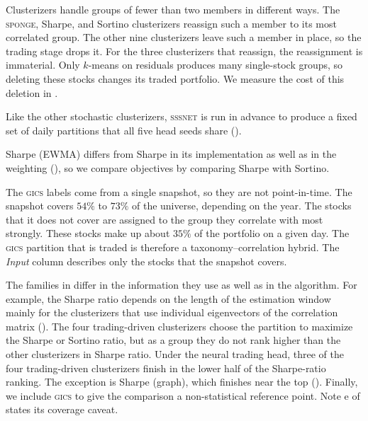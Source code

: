 \begin{table}[htbp]
\begin{threeparttable}
\begin{tablenotes}[flushleft]
\item[b] Clusterizers handle groups of fewer than two members in different ways.
The \textsc{sponge}, Sharpe, and Sortino clusterizers reassign such a member to its most
correlated group. The other nine clusterizers leave such a member in place, so the trading
stage drops it. For the three clusterizers that reassign, the reassignment is immaterial. Only $k$-means on residuals produces many single-stock groups, so deleting these stocks changes its traded portfolio. We measure the cost of this deletion in .
\item[c] Like the other stochastic clusterizers, \textsc{sssnet} is run in advance to produce a fixed set of daily partitions that all five head seeds share ().
\item[d] Sharpe (EWMA) differs from Sharpe in its implementation as well as in the weighting (), so we compare objectives by comparing Sharpe with Sortino.
\item[e] The \textsc{gics} labels come from a single snapshot, so they are not point-in-time. The snapshot covers $54\%$ to $73\%$ of the universe, depending on the year.
The stocks that it does not cover are assigned to the group they correlate with most strongly. These stocks make up about $35\%$ of the portfolio on a given
day. The \textsc{gics} partition that is
traded is therefore a taxonomy--correlation hybrid. The \emph{Input} column describes only the stocks that the snapshot covers.
\end{tablenotes}
\end{threeparttable}
\end{table}

The families in  differ in the information they use as well as in the algorithm. For example, the Sharpe ratio depends on the length of the estimation window mainly for the clusterizers that use individual eigenvectors of the correlation matrix (). The four trading-driven clusterizers choose the partition to maximize the Sharpe or Sortino ratio, but as a group they do not rank higher than the other clusterizers in Sharpe ratio. Under the neural trading head, three of the four trading-driven clusterizers finish in the lower half of the Sharpe-ratio ranking. The exception is Sharpe (graph), which finishes near the top (). Finally, we include \textsc{gics} to give the
comparison a non-statistical reference point. Note e of  states its coverage caveat.


